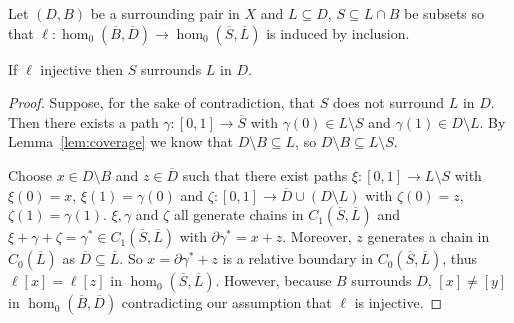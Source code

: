 \begin{lemma}\label{lem:cov_surrounds}
  Let $(D, B)$ be a surrounding pair in $X$ and $L\subseteq D$, $S\subseteq L\cap B$ be subsets so that $\ell: \hom_0(\overline{B}, \overline{D})\to \hom_0(\overline{S}, \overline{L})$ is induced by inclusion.

  If $\ell$ injective then $S$ surrounds $L$ in $D$.
\end{lemma}
\begin{proof}
  Suppose, for the sake of contradiction, that $S$ does not surround $L$ in $D$.
  Then there exists a path $\gamma : [0,1]\to\overline{S}$ with $\gamma(0)\in L\setminus S$ and $\gamma(1)\in D\setminus L$.
  By Lemma~\ref{lem:coverage} we know that $D\setminus B\subseteq L$, so $D\setminus B\subseteq L\setminus S$.

  Choose $x\in D\setminus B$ and $z\in \overline{D}$ such that there exist paths $\xi : [0,1]\to L\setminus S$ with $\xi(0) = x$, $\xi(1) = \gamma(0)$ and $\zeta : [0,1]\to \overline{D}\cup (D\setminus L)$ with $\zeta(0) = z$, $\zeta(1) = \gamma(1)$.
  $\xi, \gamma$ and $\zeta$ all generate chains in $C_1(\overline{S}, \overline{L})$ and $\xi + \gamma + \zeta = \gamma^*\in C_1(\overline{S}, \overline{L})$ with $\partial\gamma^* = x + z$.
  Moreover, $z$ generates a chain in $C_0(\overline{L})$ as $\overline{D}\subseteq\overline{L}$.
  So $x = \partial\gamma^* + z$ is a relative boundary in $C_0(\overline{S}, \overline{L})$, thus $\ell[x] = \ell[z]$ in $\hom_0(\overline{S}, \overline{L})$.
  However, because $B$ surrounds $D$, $[x]\neq [y]$ in $\hom_0(\overline{B}, \overline{D})$ contradicting our assumption that $\ell$ is injective.
\end{proof}

